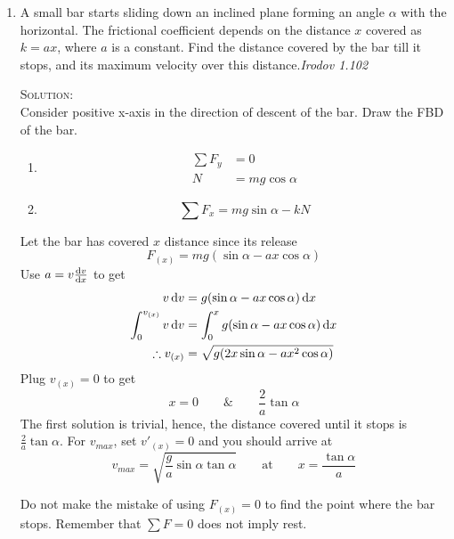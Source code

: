 \begin{enumerate}
\item A small bar starts sliding down an inclined plane forming an angle $\alpha$ with the horizontal. The frictional coefficient depends on the distance $x$ covered as $k=ax$, where $a$ is a constant. Find the distance covered by the bar till it stops, and its maximum velocity over this distance.\hfill\textsl{Irodov 1.102}

\textsc{Solution:}\\
Consider positive x-axis in the direction of descent of the bar. Draw the FBD of the bar.
\begin{figure}[hbt]
    \centering
    
\end{figure}
\begin{enumerate}
\item \begin{align*}
\sum F_y&=0\\
N&=mg\cos\alpha
\end{align*}
\item \begin{equation*}
\sum F_x=mg\sin\alpha-kN
\end{equation*}
\end{enumerate}
Let the bar has covered $x$ distance since its release
\begin{equation*}
F_{(x)}=mg(\sin\alpha-ax\cos\alpha)
\end{equation*}
Use $a=v\frac{\mathop{}\!\mathrm{d} v}{\mathop{}\!\mathrm{d} x}$ to get
\begin{align*}
v \mathop{}\!\mathrm{d} v &= g(\sin\alpha-ax\cos\alpha)\mathop{}\!\mathrm{d} x\\
\int_0^{v_{(x)}} v \mathop{}\!\mathrm{d} v&=\int_0^x g(\sin\alpha-ax\cos\alpha)\mathop{}\!\mathrm{d} x\\
\therefore v_{(x)}&=\sqrt{g(2x\sin\alpha-ax^2\cos\alpha)}
\end{align*}
Plug $v_{(x)}=0$ to get
\begin{equation*}
x=0 \qquad \text{\&} \qquad \frac{2}{a}\tan\alpha
\end{equation*}
The first solution is trivial, hence, the distance covered until it stops is $\frac{2}{a}\tan\alpha$.
For $v_{max}$, set $v'_{(x)}=0$ and you should arrive at
\begin{equation}
v_{max}=\sqrt{\frac{g}{a}\sin\alpha\tan\alpha} \qquad \text{at} \qquad x=\frac{\tan\alpha}{a} \nonumber
\end{equation}
\begin{note}
Do not make the mistake of using $F_{(x)}=0$ to find the point where the bar stops. Remember that $\sum F=0$ does not imply rest.
\end{note}


\end{enumerate}

